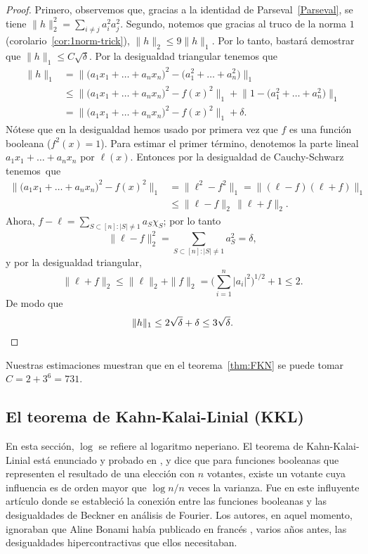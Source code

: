 \documentclass[autocontact]{gaceta}
\begin{document}
\begin{proof}
Primero, observemos que, gracias a la identidad de Parseval~\eqref{Parseval}, se tiene $\|h\|_2^2 = \sum_{i\neq j} a_i^2 a_j^2$. Segundo, notemos que gracias al truco de la norma $1$ (corolario~\ref{cor:1norm-trick}), $\|h\|_2\leq 9 \|h\|_1$. Por lo tanto, bastará demostrar que $\|h\|_1\leq C\sqrt{\delta}$. Por la desigualdad triangular tenemos que
\begin{align*}
   \|h\|_1 &= \big\|
   \big( a_1 x_1 + \dots + a_n x_n \big)^2
   - \big(a_1^2 + \dots + a_n^2 \big)
   \big\|_1
   \\
   &\leq \big\| \big( a_1 x_1 + \dots + a_n x_n \big)^2
   - f(x)^2 \big\|_1
   + \big\| 1 - \big(a_1^2 + \dots + a_n^2 \big) \big\|_1
   \\
   &= \big\| \big(a_1 x_1 + \dots + a_n x_n \big)^2
   - f(x)^2 \big\|_1 + \delta.
\end{align*}
Nótese que en la desigualdad hemos usado por primera vez que $f$ es una función booleana ($f^2(x)=1$). Para estimar el primer término, denotemos la parte lineal $a_1x_1+\dots +a_n x_n$ por $\ell(x)$. Entonces por la desigualdad de Cauchy-Schwarz tenemos~que
\begin{align*}
   \big\| \big(a_1 x_1 + \dots + a_n x_n \big)^2
   - f(x)^2 \big\|_1
   &= \|\ell^2-f^2\|_1
   = \|(\ell-f)(\ell + f)\|_1
   \\
   &\leq \| \ell-f \|_2 \, \| \ell+f \|_2.
\end{align*}
Ahora, $f - \ell = \sum_{S\subset [n] \colon |S|\neq 1} a_S \chi_S$; por lo tanto
\[
   \|\ell-f\|_2^2 = \sum_{S\subset [n] \colon |S|\neq 1} a_S^2 = \delta,
\]
y por la desigualdad triangular,
\[
   \|\ell+f\|_2
   \leq \|\ell\|_2 + \|f\|_2
   = \Big(\sum_{i=1}^n|a_i|^2\Big)^{1/2} +1
   \leq 2.
\]
De modo que
\[
   \|h\|_1 \leq 2 \sqrt{\delta} + \delta \leq 3\sqrt{\delta}.
   \qedhere
\]
\end{proof}

Nuestras estimaciones muestran que en el teorema~\ref{thm:FKN} se puede tomar $C=2+3^6=731$.

\subsection{El teorema de Kahn-Kalai-Linial (KKL)}

En esta sección, $\log$ se refiere al logaritmo neperiano. El teorema de Kahn-Kalai-Linial está enunciado y probado en \cite{KKL88}, y dice que para funciones booleanas que representen el resultado de una elección con $n$ votantes, existe un votante cuya influencia es de orden mayor que $\log n/n$ veces la varianza. Fue en este influyente artículo donde se estableció la conexión entre las funciones booleanas y las desigualdades de Beckner \cite{Bec75} en análisis de Fourier. Los autores, en aquel momento, ignoraban que Aline Bonami había publicado en francés \cite{Bon68,Bon70}, varios años antes, las desigualdades hipercontractivas que ellos necesitaban.
\end{document}

